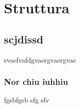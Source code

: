 \section{Struttura}
	\subsection{scjdissd}
	rvaefvafdgvaergvaergvae
		\subsubsection{Nor chiu iuhhiu}
		fgsbfgsb sfg sfv 

		


